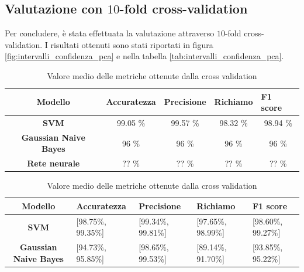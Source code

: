 \subsection*{Valutazione con $10$-fold cross-validation}
Per concludere, è stata effettuata la valutazione attraverso $10$-fold
cross-validation. I risultati ottenuti sono stati riportati in figura
\ref{fig:intervalli_confidenza_pca} e nella tabella \ref{tab:intervalli_confidenza_pca}.
\begin{table}[!ht]
    \begin{subtable}[h]{1\textwidth}
        \centering
        \begin{tabular}{@{}cllll@{}}
            \toprule
            \rowcolor[HTML]{EFEFEF}
            \textbf{Modello}                                      & \textbf{Accuratezza}         & \textbf{Precisione}          & \textbf{Richiamo}            & \textbf{F1 score}            \\ \midrule
            \cellcolor[HTML]{EFEFEF}\textbf{SVM}                  & \multicolumn{1}{c}{99.05 \%} & \multicolumn{1}{c}{99.57 \%} & \multicolumn{1}{c}{98.32 \%} & \multicolumn{1}{c}{98.94 \%} \\
            \cellcolor[HTML]{EFEFEF}\textbf{Gaussian Naive Bayes} & \multicolumn{1}{c}{96 \%}    & \multicolumn{1}{c}{96 \%}    & \multicolumn{1}{c}{96 \%}    & \multicolumn{1}{c}{96 \%}    \\
            \cellcolor[HTML]{EFEFEF}\textbf{Rete neurale}         & \multicolumn{1}{c}{?? \%}    & \multicolumn{1}{c}{?? \%}    & \multicolumn{1}{c}{?? \%}    & \multicolumn{1}{c}{?? \%}    \\ \bottomrule
        \end{tabular}
        \caption{Valore medio delle metriche ottenute dalla cross validation}
        \label{tab:risultati_cross_val_pca}
    \end{subtable}
    \hfill
    \begin{subtable}[h]{1\textwidth}
        \centering
        \begin{tabular}{@{}cllll@{}}
            \toprule
            \rowcolor[HTML]{EFEFEF}
            \textbf{Modello}                                      & \textbf{Accuratezza} & \textbf{Precisione} & \textbf{Richiamo}  & \textbf{F1 score}  \\ \midrule
            \cellcolor[HTML]{EFEFEF}\textbf{SVM}                  & [98.75\%, 99.35\%]   & [99.34\%, 99.81\%]  & [97.65\%, 98.99\%] & [98.60\%, 99.27\%] \\
            \cellcolor[HTML]{EFEFEF}\textbf{Gaussian Naive Bayes} & [94.73\%, 95.85\%]   & [98.65\%, 99.53\%]  & [89.14\%, 91.70\%] & [93.85\%, 95.22\%] \\

\end{tabular}
\end{subtable}
\end{table}
